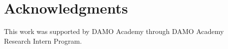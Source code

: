 \section*{Acknowledgments}
This work was supported by DAMO Academy through DAMO Academy Research Intern Program. 